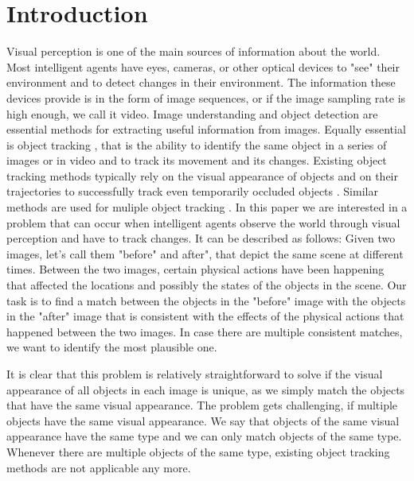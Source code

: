 \documentclass[letterpaper]{article}
\begin{document}
    

\section{Introduction}

Visual perception is one of the main sources of information about the world. Most intelligent agents have eyes, cameras, or other optical devices to "see" their environment and to detect changes in their environment. The information these devices provide is in the form of image sequences, or if the image sampling rate is high enough, we call it video.
Image understanding \cite{} and object detection \cite{} are essential methods for extracting useful information from images. Equally essential is object tracking \cite{}, that is the ability to identify the same object in a series of images or in video and to track its movement and its changes. Existing object tracking methods typically rely on the visual appearance of objects and on their trajectories to successfully track even temporarily occluded objects \cite{}.
Similar methods are used for muliple object tracking \cite{}.
In this paper we are interested in a problem that can occur when intelligent agents observe the world through visual perception and have to track changes.
It can be described as follows: Given two images, let's call them "before" and after", that depict the same scene at different times. Between the two images, certain physical actions have been happening that affected the locations and possibly the states of the objects in the scene. Our task is to find a match between the objects in the "before" image with the objects in the "after" image that is consistent with the effects of the physical actions that happened between the two images. In case there are multiple consistent matches, we want to identify the most plausible one.

It is clear that this problem is relatively straightforward to solve if the visual appearance of all objects in each image is unique, as we simply match the objects that have the same visual appearance. The problem gets challenging, if multiple objects have the same visual appearance. We say that objects of the same visual appearance have the same type and we can only match objects of the same type. Whenever there are multiple objects of the same type, existing object tracking methods are not applicable any more.
\end{document}
